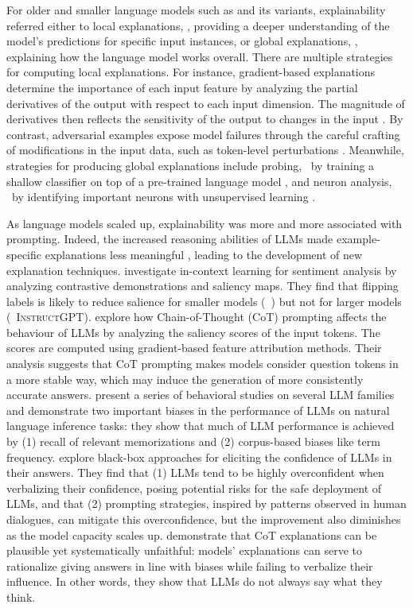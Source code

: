 For older and smaller language models such as {\bert} \citep{devlin-etal-2019-bert} and its variants, explainability referred either to local explanations, {\ie}, providing a deeper understanding of the model's predictions for specific input instances, or global explanations, {\ie}, explaining how the language model works overall. There are multiple strategies for computing local explanations. For instance, gradient-based explanations determine the importance of each input feature by analyzing the partial derivatives of the output with respect to each input dimension. The magnitude of derivatives then reflects the sensitivity of the output to changes in the input \citep{kindermans2019reliability}. By contrast, adversarial examples expose model failures through the careful crafting of modifications in the input data, such as token-level perturbations \citep{jin2020bert}. Meanwhile, strategies for producing global explanations include probing, {\eg}\ by training a shallow classifier on top of a pre-trained language model \citep{lin-etal-2019-open}, and neuron analysis, {\eg}\ by identifying important neurons with unsupervised learning \citep{bau2019identifying}.

As language models scaled up, explainability was more and more associated with prompting. Indeed, the increased reasoning abilities of LLMs made example-specific explanations less meaningful \citep{wei2023larger}, leading to the development of new explanation techniques. \citet{li2023towards} investigate in-context learning for sentiment analysis by analyzing contrastive demonstrations and saliency maps. They find that flipping labels is likely to reduce salience for smaller models ({\eg}\ {\gptt}) but not for larger models ({\eg}\ \textsc{InstructGPT}). \citet{wu2023analyzing} explore how Chain-of-Thought (CoT) prompting affects the behaviour of LLMs by analyzing the saliency scores of the input tokens. The scores are computed using gradient-based feature attribution methods. Their analysis suggests that CoT prompting makes models consider question tokens in a more stable way, which may induce the generation of more consistently accurate answers. \citet{mckenna-etal-2023-sources} present a series of behavioral studies on several LLM families and demonstrate two important biases in the performance of LLMs on natural language inference tasks: they show that much of LLM performance is achieved by (1) recall of relevant memorizations and (2) corpus-based biases like term frequency. \citet{xiong2023can} explore black-box approaches for eliciting the confidence of LLMs in their answers. They find that (1) LLMs tend to be highly overconfident when verbalizing their confidence, posing potential risks for the safe deployment of LLMs, and that (2) prompting strategies, inspired by patterns observed in human dialogues, can mitigate this overconfidence, but the improvement also diminishes as the model capacity scales up. \citet{turpin2024language} demonstrate that CoT explanations can be plausible yet systematically unfaithful: models’ explanations can serve to rationalize giving answers in line with biases while failing to verbalize their influence. In other words, they show that LLMs do not always say what they think.

